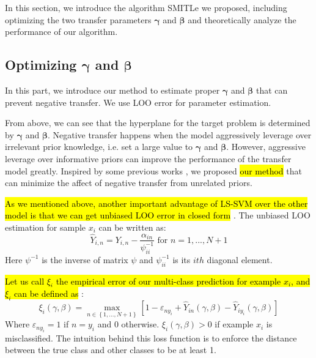 In this section, we introduce the algorithm SMITLe we proposed, including optimizing the two transfer parameters $\boldsymbol{\gamma}$ and $\boldsymbol{\beta}$ and theoretically analyze the performance of our algorithm.
\subsection{Optimizing $\boldsymbol{\gamma}$ and $\boldsymbol{\beta}$}
In this part, we introduce our method to estimate proper $\boldsymbol{\gamma}$ and $\boldsymbol{\beta}$ that can prevent negative transfer. We use LOO error for parameter estimation. 

From above, we can see that the hyperplane for the target problem is determined by $\boldsymbol{\gamma}$ and $\boldsymbol{\beta}$. Negative transfer happens when the model aggressively leverage over irrelevant prior knowledge, i.e. set a  large value to $\boldsymbol{\gamma}$ and $\boldsymbol{\beta}$. However, aggressive leverage over informative priors can improve the performance of the transfer model greatly. Inspired by some previous works \cite{tommasi2014learning} \cite{kuzborskij2013n}, we proposed \hl{our method} that can minimize the affect of negative transfer from unrelated priors.

\hl{As we mentioned above, another important advantage of LS-SVM over the other model is that we can get unbiased LOO error in closed form} \cite{cawley2006leave}. The unbiased LOO estimation for sample $x_i$ can be written as:
\begin{equation}
{\hat Y_{i,n}} = {Y_{i,n}} - \frac{{{\alpha _{in}}}}{{\psi_{ii}^{ - 1}}}{\text{    for   }}n = 1,...,N + 1
\end{equation}
Here $\psi^{-1}$ is the inverse of matrix $\psi$ and  $\psi_{ii}^{-1}$ is its $ith$ diagonal element. 

\hl{Let us call $\xi_i$ the empirical error of our multi-class prediction for example $x_i$, and $\xi_i$ can be defined as} \cite{crammer2002algorithmic}:
\begin{equation}\label{eq:train_loss}
\xi_i(\gamma,\beta) = \mathop {\max }\limits_{n \in \left\lbrace 1,...,N+1 \right\rbrace } {\left[ {1 - {\varepsilon _{n{y_i}}} + {{\hat Y}_{in}}\left( {\gamma ,\beta } \right) - {{\hat Y}_{i{y_i}}}\left( {\gamma ,\beta } \right)} \right]}
\end{equation}
Where $\varepsilon _{n{y_i}}=1$ if $n=y_i$ and 0 otherwise. $\xi_i(\gamma,\beta)>0$ if example $x_i$ is misclassified. The intuition behind this loss function is to enforce the distance between the true class and other classes to be at least 1.

